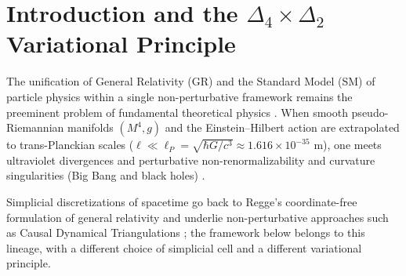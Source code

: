 \documentclass[11pt,a4paper,reqno]{amsart}
\theoremstyle{definition}
\numberwithin{equation}{section}
\begin{document}
\begin{abstract}
Order-of-magnitude estimates show that Planck-suppressed observational signatures of the kind considered here lie many orders of magnitude below current and planned experimental reach; in the anisotropic $z = 3$ realization the scale $M_\ast$ cannot be the Planck mass, and we quote the bounds that apply to it. The constraint bounds of statement (2) are formalized in Lean~4 with Mathlib (\texttt{formal\_proofs\_mathlib}); the remaining accompanying Lean~4 files are a naming skeleton and verify nothing else in this paper.
\end{abstract}

\maketitle

\tableofcontents

\section{Introduction and the \texorpdfstring{$\Delta_4 \times \Delta_2$}{Delta4 x Delta2} Variational Principle}
\label{sec:intro}

The unification of General Relativity (GR) and the Standard Model (SM) of particle physics within a single non-perturbative framework remains the preeminent problem of fundamental theoretical physics \cite{jaffe2006quantum, ambjorn2012nonperturbative}. When smooth pseudo-Riemannian manifolds $(M^4, g)$ and the Einstein--Hilbert action are extrapolated to trans-Planckian scales ($\ell \ll \ell_P = \sqrt{\hbar G/c^3} \approx 1.616 \times 10^{-35}\text{ m}$), one meets ultraviolet divergences and perturbative non-renormalizability \cite{goroff1986ultraviolet} and curvature singularities (Big Bang and black holes) \cite{hawking1970singularities}.

Simplicial discretizations of spacetime go back to Regge's coordinate-free formulation of general relativity \cite{regge1961general} and underlie non-perturbative approaches such as Causal Dynamical Triangulations \cite{ambjorn2001dynamically}; the framework below belongs to this lineage, with a different choice of simplicial cell and a different variational principle.
\end{document}
